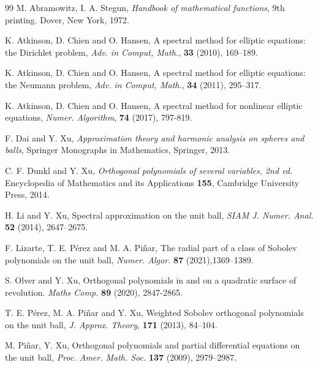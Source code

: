 \documentclass{amsart}
\theoremstyle{plain}%
\theoremstyle{definition}
\theoremstyle{remark}
\begin{document}
\begin{thebibliography}{99}
       M. Abramowitz, I. A. Stegun, 
       \textit{Handbook of mathematical functions},  
       9th printing. Dover, New York, 1972.

        K. Atkinson, D. Chien and O. Hansen,
        A spectral method for elliptic equations: the Dirichlet problem, 
        \textit{Adv. in Comput, Math.}, \textbf{33} (2010), 169--189.

        K. Atkinson, D. Chien and O. Hansen,
        A spectral method for elliptic equations: the Neumann problem, 
        \textit{Adv. in Comput, Math.}, \textbf{34} (2011), 295--317.
        
        K. Atkinson, D. Chien and O. Hansen,
        A spectral method for nonlinear elliptic equations,
        \textit{Numer. Algorithm}, \textbf{74} (2017), 797-819. 
  
        F. Dai and Y. Xu, 
        \textit{Approximation theory and harmonic analysis on spheres and balls}, 
        Springer Monographs in Mathematics, Springer, 2013. 
             
       C. F. Dunkl and Y. Xu, 
       \textit{Orthogonal polynomials of several variables, 2nd ed.}
       Encyclopedia of Mathematics and its Applications \textbf{155}, Cambridge
       University Press, 2014.

         H. Li and Y. Xu,
         Spectral approximation on the unit ball,
         \textit{SIAM J. Numer. Anal.} \textbf{52} (2014), 2647--2675.

         F. Lizarte, T. E. P\'erez and M. A. Pi\~nar, 
         The radial part of a class of Sobolev polynomials on the unit ball, 
        \textit{Numer. Algor.} \textbf{87} (2021),1369--1389.   

      S. Olver and Y. Xu, 
      Orthogonal polynomials in and on a  quadratic surface of revolution. 
      \textit{ Maths Comp.} \textbf{89} (2020), 2847-2865.


        T. E. P\'erez, M. A. Pi\~{n}ar and Y. Xu, 
        Weighted Sobolev orthogonal polynomials on the unit ball,
        {\it J. Approx. Theory},  {\bf 171} (2013), 84--104.

      M. Pi\~nar, Y. Xu, 
      Orthogonal polynomials and partial differential equations on the unit ball, 
      \textit{Proc. Amer. Math. Soc.} \textbf{137} (2009), 2979--2987.
        

\end{thebibliography}
\end{document}
